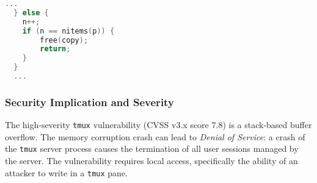 \documentclass[11pt,a4paper,twocolumn]{article}
\begin{document}
\begin{lstlisting}[language=C, caption=Fixed logic: Bounds check added to prevent stack buffer overflow in else statement, label={lst:fixed-sgr-simplified}]
  ...
  } else {
    n++;
    if (n == nitems(p)) {
        free(copy);
        return;
    }
  }
  ...
\end{lstlisting}

\subsubsection*{Security Implication and Severity}
\label{ssec:implications_cve_2020_27347}

The high-severity {\texttt{tmux}} vulnerability \cite{CVE-2020-27347} (CVSS v3.x score 7.8) is a stack-based buffer overflow. The memory corruption crash can lead to \textit{Denial of Service}: a crash of the \texttt{tmux} server process causes the termination of all user sessions managed by the server.
The vulnerability requires local access, specifically the ability of an attacker to write in a \texttt{tmux} pane.

\printbibliography
\end{document}
